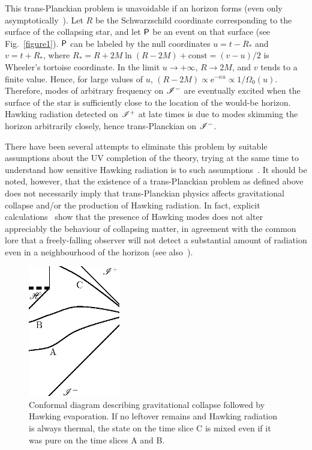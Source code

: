\documentclass[prd, groupedaddress, showpacs, showkeys, onecolumn, nofootinbib]{revtex4}
\begin{document}
This trans-Planckian problem is unavoidable if an horizon forms (even only asymptotically~\cite{Barcelo:2006np, Barcelo:2006uw}).  Let $R$ be the Schwarzschild coordinate corresponding to the surface of the collapsing star, and let $\sf P$ be an event on that surface (see Fig.~\ref{figure1}).  $\sf P$ can be labeled by the null coordinates $u=t-R_\ast$ and $v=t+R_\ast$, where $R_\ast=R+2M\ln\left(R-2M\right)+\mbox{const}=\left(v-u\right)/2$ is Wheeler's tortoise coordinate.  In the limit $u\to +\infty$, $R\to 2M$, and $v$ tends to a finite value.  Hence, for large values of $u$, $(R-2M)\propto \mathrm{e}^{-\kappa u}\propto 1/\Omega_0(u)$. Therefore, modes of arbitrary frequency on $\mathscr{I}^-$ are eventually excited when the surface of the star is sufficiently close to the location of the would-be horizon.  Hawking radiation detected on $\mathscr{I}^+$ at late times is due to modes skimming the horizon arbitrarily closely, hence trans-Planckian on $\mathscr{I}^-$.

There have been several attempts to eliminate this problem by suitable assumptions about the UV completion of the theory, trying at the same time to understand how sensitive Hawking radiation is to such assumptions~\cite{Brout:1995wp, Corley:1996ar, Barrabes:1998iw, Parentani:1999qv, Barrabes:2000fr, Parentani:2000ts, Parentani:2007mb, Unruh:2004zk}.  It should be noted, however, that the existence of a trans-Planckian problem as defined above does not necessarily imply that trans-Planckian physics affects gravitational collapse and/or the production of Hawking radiation.  In fact, explicit calculations~\cite{Massar:1996tx,Giddings:2006sj} show that the presence of Hawking modes does not alter appreciably the behaviour of collapsing matter, in agreement with the common lore that a freely-falling observer will not detect a substantial amount of radiation even in a neighbourhood of the horizon (see also~\cite{Barcelo:2007yk}).
\vskip 1.5cm
%
\begin{figure}[htb]
\begin{center}
\includegraphics[width=4cm]{slices.eps}
\end{center}
\vskip 2.3cm
\caption{Conformal diagram describing gravitational collapse followed by Hawking evaporation.  If no leftover remains and Hawking radiation is always thermal, the state on the time slice C is mixed even if it was pure on the time slices A and B.}
\label{figure2}
\end{figure}
%
\end{document}
